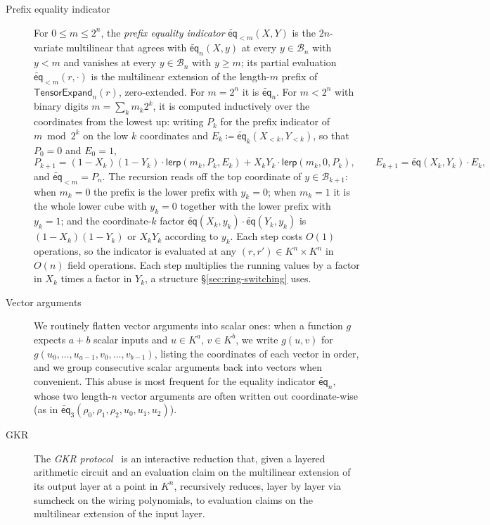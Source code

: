 \documentclass{article}
\theoremstyle{definition}
\newcommand*{\mle}{\widetilde}
\newcommand{\eq}{\mathsf{eq}}
\newcommand{\BB}{\mathcal{B}}
\begin{document}
\begin{description}
\item[Prefix equality indicator] For $0 \le m \le 2^n$, the \emph{prefix equality indicator} $\mle{\eq}_{< m}(X, Y)$ is the $2n$-variate multilinear that agrees with $\mle{\eq}_n(X, y)$ at every $y \in \BB_n$ with $y < m$ and vanishes at every $y \in \BB_n$ with $y \ge m$; its partial evaluation $\mle{\eq}_{< m}(r, \cdot)$ is the multilinear extension of the length-$m$ prefix of $\textsf{TensorExpand}_n(r)$, zero-extended. For $m = 2^n$ it is $\mle{\eq}_n$. For $m < 2^n$ with binary digits $m = \sum_k m_k 2^k$, it is computed inductively over the coordinates from the lowest up: writing $P_k$ for the prefix indicator of $m \bmod 2^k$ on the low $k$ coordinates and $E_k \coloneqq \mle{\eq}_k(X_{< k}, Y_{< k})$, so that $P_0 = 0$ and $E_0 = 1$,
\[
  P_{k + 1} = (1 - X_k)(1 - Y_k) \cdot \textsf{lerp}(m_k, P_k, E_k) + X_k Y_k \cdot \textsf{lerp}(m_k, 0, P_k), \qquad E_{k + 1} = \mle{\eq}(X_k, Y_k) \cdot E_k,
\]
and $\mle{\eq}_{< m} = P_n$. The recursion reads off the top coordinate of $y \in \BB_{k + 1}$: when $m_k = 0$ the prefix is the lower prefix with $y_k = 0$; when $m_k = 1$ it is the whole lower cube with $y_k = 0$ together with the lower prefix with $y_k = 1$; and the coordinate-$k$ factor $\mle{\eq}(X_k, y_k) \cdot \mle{\eq}(Y_k, y_k)$ is $(1 - X_k)(1 - Y_k)$ or $X_k Y_k$ according to $y_k$. Each step costs $O(1)$ operations, so the indicator is evaluated at any $(r, r') \in K^n \times K^n$ in $O(n)$ field operations. Each step multiplies the running values by a factor in $X_k$ times a factor in $Y_k$, a structure \S\ref{sec:ring-switching} uses.

\item[Vector arguments] We routinely flatten vector arguments into scalar ones: when a function $g$ expects $a + b$ scalar inputs and $u \in K^a$, $v \in K^b$, we write $g(u, v)$ for $g(u_0, \ldots, u_{a - 1}, v_0, \ldots, v_{b - 1})$, listing the coordinates of each vector in order, and we group consecutive scalar arguments back into vectors when convenient. This abuse is most frequent for the equality indicator $\mle{\eq}_n$, whose two length-$n$ vector arguments are often written out coordinate-wise (as in $\mle{\eq}_3(\rho_0, \rho_1, \rho_2, u_0, u_1, u_2)$).

\item[GKR] The \emph{GKR protocol}~\cite{Goldwasser:2015aa} is an interactive reduction that, given a layered arithmetic circuit and an evaluation claim on the multilinear extension of its output layer at a point in $K^n$, recursively reduces, layer by layer via sumcheck on the wiring polynomials, to evaluation claims on the multilinear extension of the input layer.
\end{description}
\end{document}
